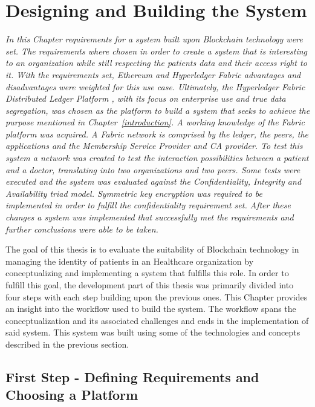 \chapter{Designing and Building the System} \label{development}

\emph{In this Chapter requirements for a system built upon Blockchain
technology were set. The requirements where chosen in order to create a system
that is interesting to an organization while still respecting the patients data
and their access right to it. With the requirements set, Ethereum and
Hyperledger Fabric advantages and disadvantages were weighted for this use
case. Ultimately, the Hyperledger Fabric Distributed Ledger Platform , with its
focus on enterprise use and true data segregation, was chosen as the platform
to build a system that seeks to achieve the purpose mentioned in
Chapter~\ref{introduction}. A working knowledge of the Fabric platform was
acquired. A Fabric network is comprised by the ledger, the peers, the
applications and the Membership Service Provider and CA provider. To test this
system a network was created to test the interaction possibilities between a
patient and a doctor, translating into two organizations and two peers. Some
tests were executed and the system was evaluated against the Confidentiality,
Integrity and Availability triad model. Symmetric key encryption was required
to be implemented in order to fulfill the confidentiality requirement set.
After these changes a system was implemented that successfully met the
requirements and further conclusions were able to be taken.}

The goal of this thesis is to evaluate the suitability of Blockchain technology
in managing the identity of patients in an Healthcare organization by
conceptualizing and implementing a system that fulfills this role. In order to
fulfill this goal, the development part of this thesis was primarily divided
into four steps with each step building upon the previous ones. This Chapter
provides an insight into the workflow used to build the system. The workflow
spans the conceptualization and its associated challenges and ends in the
implementation of said system. This system was built using some of the
technologies and concepts described in the previous section.

\section{First Step - Defining Requirements and Choosing a
Platform}\label{choosingHyperledger}

